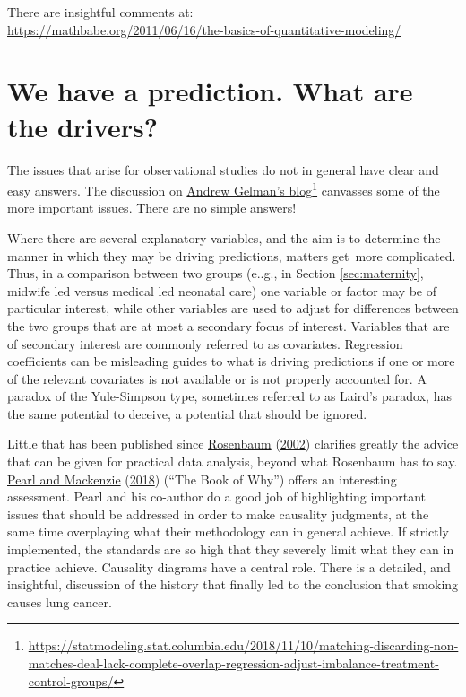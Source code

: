 \documentclass[
  10pt,
  b5paper]{book}
\begin{document}
There are insightful comments at:\\
\url{https://mathbabe.org/2011/06/16/the-basics-of-quantitative-modeling/}

\hypertarget{we-have-a-prediction.-what-are-the-drivers}{%
\section{We have a prediction. What are the drivers?}\label{we-have-a-prediction.-what-are-the-drivers}}

The issues that arise for observational studies do not in general have
clear and easy answers. The discussion on
\href{https://statmodeling.stat.columbia.edu/2018/11/10/matching-discarding-non-matches-deal-lack-complete-overlap-regression-adjust-imbalance-treatment-control-groups/}{Andrew Gelman's blog}\footnote{\url{https://statmodeling.stat.columbia.edu/2018/11/10/matching-discarding-non-matches-deal-lack-complete-overlap-regression-adjust-imbalance-treatment-control-groups/}} canvasses some of the more important issues. There are no simple answers!

Where there are several explanatory variables, and the aim is
to determine the manner in which they may be driving predictions,
matters get~more complicated. Thus, in a comparison between
two groups (e..g., in Section \ref{sec:maternity}, midwife led
versus medical led neonatal care) one variable or factor may
be of particular interest, while other variables are used to
adjust for differences between the two groups that are at
most a secondary focus of interest. Variables that are of
secondary interest are commonly referred to as covariates.
Regression coefficients can be misleading guides to what is
driving predictions if one or more of the relevant covariates
is not available or is not properly accounted for. A paradox
of the Yule-Simpson type, sometimes referred to as Laird's
paradox, has the same potential to deceive, a potential that
should be ignored.

Little that has been published since \protect\hyperlink{ref-RosBook}{Rosenbaum} (\protect\hyperlink{ref-RosBook}{2002}) clarifies greatly the
advice that can be given for practical data analysis, beyond what
Rosenbaum has to say. \protect\hyperlink{ref-pearl2018book}{Pearl and Mackenzie} (\protect\hyperlink{ref-pearl2018book}{2018}) (``The Book of Why'') offers an
interesting assessment. Pearl and his co-author do a good job of
highlighting important issues that should be addressed in order to
make causality judgments, at the same time overplaying what their
methodology can in general achieve. If strictly implemented,
the standards are so high that they severely limit what they can
in practice achieve. Causality diagrams have a central role.
There is a detailed, and insightful, discussion of the history
that finally led to the conclusion that smoking causes lung cancer.
\end{document}
